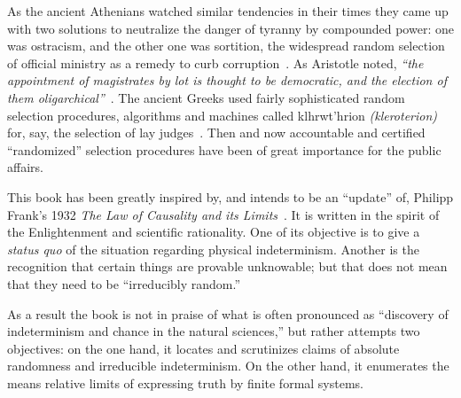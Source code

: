 As the ancient Athenians watched similar tendencies in their times they came up with two solutions to neutralize the danger of
tyranny by compounded power:
one was ostracism, and the other one was sortition,
the widespread random selection of official ministry
as a remedy to curb corruption~\cite[p.~77]{Headlam-ebtliA}.
As Aristotle noted,
{\em ``the appointment of
magistrates by lot is thought to be democratic, and the
election of them oligarchical''}~\cite[Politics~IV,~$1294^b8$, pp.~4408-4409]{barnes-aristotle}.
The ancient Greeks used fairly sophisticated random selection procedures, algorithms and machines
called \textgreek{klhrwt'hrion} {\it (kleroterion)}  for, say, the selection of lay judges~\cite{dow_aristotlekleroteria_1939,Demont-2003}.
Then and now accountable and certified ``randomized'' selection procedures have been of great importance for the public affairs.




This book has been greatly inspired by, and intends to be an ``update''
of, Philipp Frank's 1932 {\it The Law of Causality and its Limits}~\cite{frank,franke}.
It is written in the spirit of the Enlightenment and scientific rationality.
One of its objective is to give a {\em status quo} of the situation regarding physical indeterminism.
Another is the recognition that certain things are provable unknowable;
but that does not mean that they need to be ``irreducibly random.''

As a result the book is not in praise of what is often pronounced as ``discovery of indeterminism and chance in the natural sciences,''
but rather attempts two objectives: on the one hand, it locates and scrutinizes claims of absolute randomness and irreducible indeterminism.
On the other hand, it enumerates the means relative limits of expressing truth by finite formal systems.

